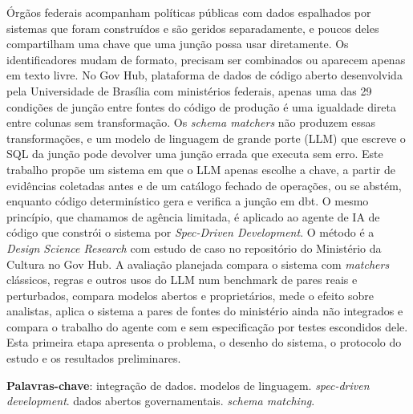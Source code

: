\begin{resumo}
Órgãos federais acompanham políticas públicas com dados espalhados por
sistemas que foram construídos e são geridos separadamente, e poucos deles
compartilham uma chave que uma junção possa usar diretamente. Os
identificadores mudam de formato, precisam ser combinados ou aparecem apenas
em texto livre. No Gov Hub, plataforma de dados de código aberto desenvolvida
pela Universidade de Brasília com ministérios federais, apenas uma das 29
condições de junção entre fontes do código de produção é uma igualdade direta
entre colunas sem transformação. Os \textit{schema matchers} não produzem
essas transformações, e um modelo de linguagem de grande porte (LLM) que
escreve o SQL da junção pode devolver uma junção errada que executa sem erro.
Este trabalho propõe um sistema em que o LLM apenas escolhe a chave, a partir
de evidências coletadas antes e de um catálogo fechado de operações, ou se
abstém, enquanto código determinístico gera e verifica a junção em dbt. O
mesmo princípio, que chamamos de agência limitada, é aplicado ao agente de IA
de código que constrói o sistema por \textit{Spec-Driven Development}. O
método é a \textit{Design Science Research} com estudo de caso no repositório
do Ministério da Cultura no Gov Hub. A avaliação planejada compara o sistema
com \textit{matchers} clássicos, regras e outros usos do LLM num benchmark de
pares reais e perturbados, compara modelos abertos e proprietários, mede o
efeito sobre analistas, aplica o sistema a pares de fontes do ministério
ainda não integrados e compara o trabalho do agente com e sem especificação
por testes escondidos dele. Esta primeira etapa apresenta o problema, o
desenho do sistema, o protocolo do estudo e os resultados preliminares.

 \vspace{\onelineskip}

 \noindent
 \textbf{Palavras-chave}: integração de dados. modelos de linguagem.
 \textit{spec-driven development}. dados abertos governamentais.
 \textit{schema matching}.
\end{resumo}
